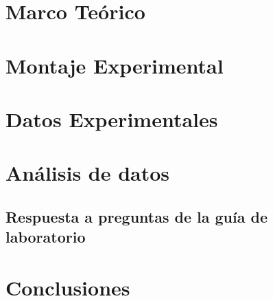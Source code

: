 \documentclass[letterpaper, 12pt]{report}
\begin{document}
\newpage

\section{Marco Teórico}

\section{Montaje Experimental}

\section{Datos Experimentales}

\section{Análisis de datos}

\subsection{Respuesta a preguntas de la guía de laboratorio}


\section{Conclusiones}

\newpage


\end{document}
